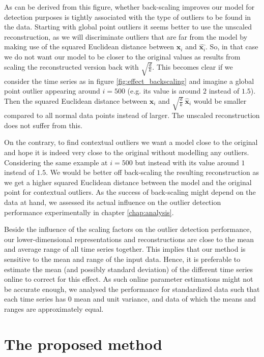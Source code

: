 As can be derived from this figure, whether back-scaling improves our model for detection purposes is tightly associated with the type of outliers to be found in the data. Starting with global point outliers it seems better to use the unscaled reconstruction, as we will discriminate outliers that are far from the model by making use of the squared Euclidean distance between $\mathbf{x}_i$ and $\hat{\mathbf{x}_i}$. So, in that case we do not want our model to be closer to the original values as results from scaling the reconstructed version back with $\sqrt{\frac{d}{k}}$. This becomes clear if we consider the time series as in figure \ref{fig:effect_backscaling} and imagine a global point outlier appearing around $i=500$ (e.g. its value is around $2$ instead of $1.5$). Then the squared Euclidean distance between $\mathbf{x}_i$ and $\sqrt{\frac{d}{k}} \ \hat{\mathbf{x}}_i$ would be smaller compared to all normal data points instead of larger. The unscaled reconstruction does not suffer from this.

On the contrary, to find contextual outliers we want a model close to the original and hope it is indeed very close to the original without modelling any outliers. Considering the same example at $i=500$ but instead with its value around $1$ instead of $1.5$. We would be better off back-scaling the resulting reconstruction as we get a higher squared Euclidean distance between the model and the original point for contextual outliers.
As the success of back-scaling might depend on the data at hand, we assessed its actual influence on the outlier detection performance experimentally in chapter \ref{chap:analysis}. 

Beside the influence of the scaling factors on the outlier detection performance, our lower-dimensional representations and reconstructions are close to the mean and average range of all time series together. This implies that our method is sensitive to the mean and range of the input data. Hence, it is preferable to estimate the mean (and possibly standard deviation) of the different time series online to correct for this effect. As such online parameter estimations might not be accurate enough, we analysed the performance for standardized data such that each time series has $0$ mean and unit variance, and data of which the means and ranges are approximately equal.


\section{The proposed method}
\label{sec:method_formulation}

